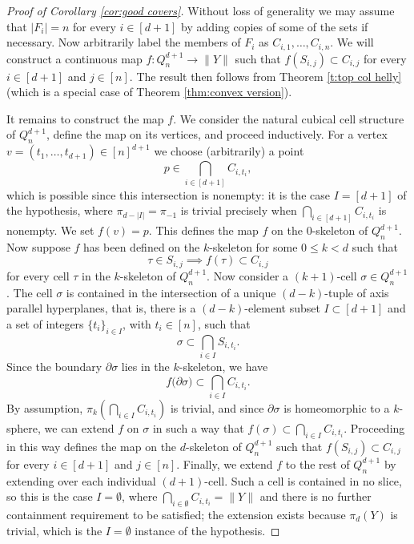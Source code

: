 \documentclass[10pt,a4paper]{amsart}
\newcommand{\bry}[1]{\partial #1}
\newcommand{\cubical}[2]{Q_{#1}^{#2}}
\newcommand{\slice}[2]{S_{#1,#2} }
\begin{document}
\begin{proof}[Proof of Corollary \ref{cor:good covers}]
Without loss of generality we may assume that $|F_i| = n$ for every $i \in [d+1]$ by adding copies of some of the sets if necessary. Now arbitrarily label the members of $F_i$ as 
$C_{i,1}, \dots, C_{i,n}$. We will construct a continuous map $f \colon \cubical{n}{d+1} \to \|Y\|$ such that 
$f(\slice{i}{j}) \subset C_{i,j}$
for every $i\in [d+1]$ and $j\in [n]$. The result then follows from Theorem \ref{t:top col helly} (which is a special case of Theorem \ref{thm:convex version}).

It remains to construct the map $f$. We consider the natural cubical cell structure of $\cubical{n}{d+1}$, define the map on its vertices, and proceed inductively. For a vertex $v = (t_1, \dots, t_{d+1}) \in [n]^{d+1}$ we choose (arbitrarily) a point 
\[p \in \bigcap_{i\in [d+1]} C_{i,t_i}, \]
which is possible since this intersection is nonempty: it is the case $I = [d+1]$ of the hypothesis, where $\pi_{d-|I|} = \pi_{-1}$ is trivial precisely when $\bigcap_{i\in [d+1]} C_{i,t_i}$ is nonempty. We set $f(v) = p$. This defines the map $f$ on the 0-skeleton of $\cubical{n}{d+1}$. 
Now suppose $f$ has been defined on the $k$-skeleton for some $0\leq k < d$ such that 
\[\tau \in \slice{i}{j} \implies f(\tau) \subset C_{i,j}\] for every cell $\tau$ in the $k$-skeleton of $\cubical{n}{d+1}$.
Now consider a $(k+1)$-cell $\sigma \in \cubical{n}{d+1}$. The cell $\sigma$ is contained in the intersection of a unique $(d-k)$-tuple of axis parallel hyperplanes, that is, there is a $(d-k)$-element subset $I\subset [d+1]$ and a set of integers $\{t_i\}_{i\in I}$, with $t_i \in [n]$, such that 
\[\sigma \subset \bigcap_{i\in I} \slice{i}{t_i}.\]
Since the boundary $\bry{\sigma}$ lies in the $k$-skeleton,  we have 
\[f\big( \bry{\sigma} \big) \subset  \bigcap_{i\in I} C_{i,t_i}. \]
By assumption,
$\pi_{k}(\bigcap_{i\in I}C_{i,t_i})$ is trivial, 
and since $\bry{\sigma}$ is homeomorphic to a $k$-sphere, we can extend $f$ on $\sigma$ in such a way  that $f(\sigma) \subset \bigcap_{i\in I} C_{i,t_i}$. Proceeding in this way defines the map on the $d$-skeleton of $\cubical{n}{d+1}$ such that $f(\slice{i}{j})\subset C_{i,j}$ for every $i\in [d+1]$ and $j\in [n]$. Finally, we extend $f$ to the rest of $\cubical{n}{d+1}$ by extending over each individual $(d+1)$-cell. Such a cell is contained in no slice, so this is the case $I = \emptyset$, where $\bigcap_{i\in \emptyset} C_{i,t_i} = \|Y\|$ and there is no further containment requirement to be satisfied; the extension exists because $\pi_d(Y)$ is trivial, which is the $I=\emptyset$ instance of the hypothesis.
\end{proof}
\end{document}
